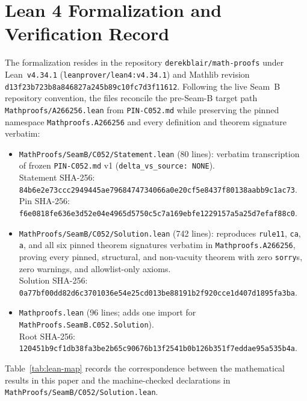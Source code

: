 \documentclass[11pt]{article}
\theoremstyle{definition}
\begin{document}
\section{Lean 4 Formalization and Verification Record}

The formalization resides in the repository \texttt{derekblair/math-proofs} under Lean~\texttt{v4.34.1} (\nolinkurl{leanprover/lean4:v4.34.1}) and Mathlib revision {\small\nolinkurl{d13f23b723b8a846827a245b89c10fc7d3f11612}}. Following the live Seam~B repository convention, the files reconcile the pre-Seam-B target path \nolinkurl{Mathproofs/A266256.lean} from \texttt{PIN-C052.md} while preserving the pinned namespace \nolinkurl{Mathproofs.A266256} and every definition and theorem signature verbatim:
\begin{itemize}\setlength{\itemsep}{2pt}
\item \nolinkurl{MathProofs/SeamB/C052/Statement.lean} (80 lines): verbatim transcription of frozen \texttt{PIN-C052.md} v1 (\texttt{delta\_vs\_source: NONE}).\\
Statement SHA-256: {\small\nolinkurl{84b6e2e73ccc2949445ae7968474734066a0e20cf5e8437f80138aabb9c1ac73}}.\\
Pin SHA-256: {\small\nolinkurl{f6e0818fe636e3d52e04e4965d5750c5c7a169ebfe1229157a5a25d7efaf88c0}}.
\item \nolinkurl{MathProofs/SeamB/C052/Solution.lean} (742 lines): reproduces \texttt{rule11}, \texttt{ca}, \texttt{a}, and all six pinned theorem signatures verbatim in \nolinkurl{Mathproofs.A266256}, proving every pinned, structural, and non-vacuity theorem with zero \texttt{sorry}s, zero warnings, and allowlist-only axioms.\\
Solution SHA-256: {\small\nolinkurl{0a77bf00dd82d6c3701036e54e25cd013be88191b2f920cce1d407d1895fa3ba}}.
\item \nolinkurl{Mathproofs.lean} (96 lines; adds one import for \nolinkurl{MathProofs.SeamB.C052.Solution}).\\
Root SHA-256: {\small\nolinkurl{120451b9cf1db38fa3be2b65c90676b13f2541b0b126b351f7eddae95a535b4a}}.
\end{itemize}

Table~\ref{tab:lean-map} records the correspondence between the mathematical results in this paper and the machine-checked declarations in \nolinkurl{MathProofs/SeamB/C052/Solution.lean}.
\end{document}
